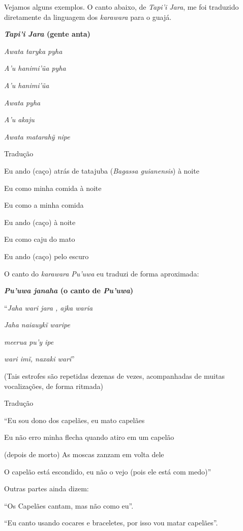 Vejamos alguns exemplos. O canto abaixo, de \emph{Tapi'i Jara}, me foi
traduzido diretamente da linguagem dos \emph{karawara} para o guajá.

\textbf{\emph{Tapi'i Jara} (gente anta) }

\emph{Awata taryka pyha}

\emph{A'u hanimi'ũa pyha}

\emph{A'u hanimi'ũa}

\emph{Awata pyha}

\emph{A'u akaju}

\emph{Awata matarahỹ nipe}

Tradução

Eu ando (caço) atrás de tatajuba (\emph{Bagassa guianensis}) à noite

Eu como minha comida à noite

Eu como a minha comida

Eu ando (caço) à noite

Eu como caju do mato

Eu ando (caço) pelo escuro

O canto do \emph{karawara} \emph{Pu'uwa} eu traduzi de forma aproximada:

\textbf{\emph{Pu'uwa janaha} (o canto de \emph{Pu'uwa})}

``\emph{Jaha wari jara , ajka waria}
 
 \emph{Jaha naiauykĩ waripe}
 
 \emph{meerua pu'y ipe}
 
 \emph{wari imĩ, naxaki wari}''

(Tais estrofes são repetidas dezenas de vezes, acompanhadas de muitas
vocalizações, de forma ritmada)

Tradução

``Eu sou dono dos capelães, eu mato capelães

Eu não erro minha flecha quando atiro em um capelão

(depois de morto) As moscas zanzam em volta dele

O capelão está escondido, eu não o vejo (pois ele está com medo)''

Outras partes ainda dizem:

``Os Capelães cantam, mas não como eu''.

``Eu canto usando cocares e braceletes, por isso vou matar capelães''.

